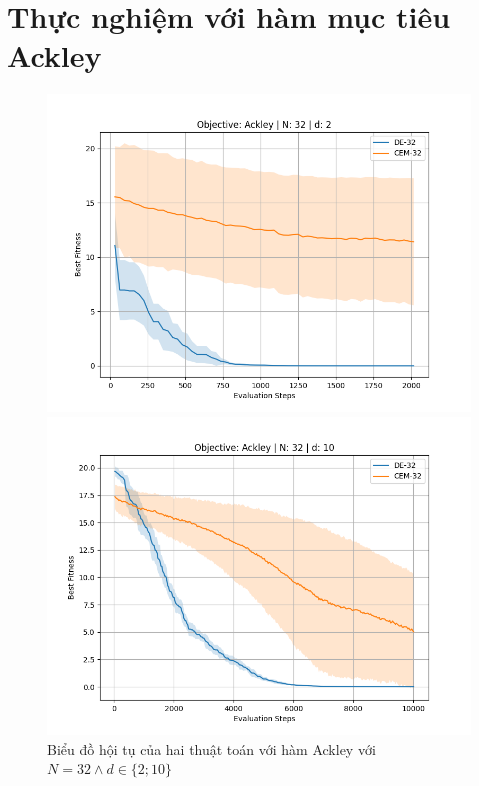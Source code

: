 \documentclass[10pt]{report}
\begin{document}
\section{Thực nghiệm với hàm mục tiêu Ackley}
\begin{figure}[H]\centering
	\caption{Biểu đồ hội tụ của hai thuật toán với hàm Ackley với \(N = 32 \wedge d \in \{2; 10\}\)}
	\begin{minipage}{0.45\textwidth}\centering
		\includegraphics[width=\textwidth]{../assets/graphs/objective=Ackley_N=32_d=2.png}
	\end{minipage}
	\begin{minipage}{0.45\textwidth}\centering
		\includegraphics[width=\textwidth]{../assets/graphs/objective=Ackley_N=32_d=10.png}
	\end{minipage}
\end{figure}
\end{document}
